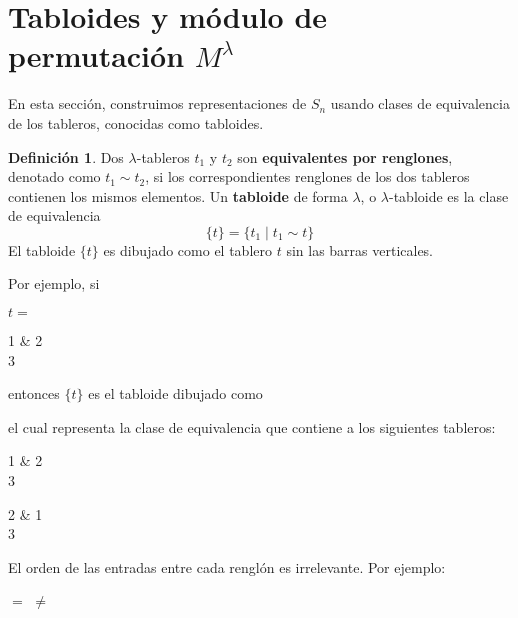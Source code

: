 \documentclass[12pt]{book}
\theoremstyle{definition}
\newtheorem{definition}[theorem]{Definición}
\newcounter{in}
\newcounter{ini}
\begin{document}
\section{Tabloides y módulo de permutación $M^{\lambda}$}
\label{modulo-permutacion}

En esta sección, construimos representaciones de $S_{n}$ usando clases
de equivalencia de los tableros, conocidas como tabloides.

\begin{definition}
  Dos $\lambda$-tableros $t_{1}$ y $t_{2}$ son \textbf{equivalentes
    por renglones}, denotado como $t_{1}\sim t_{2}$, si los
  correspondientes renglones de los dos tableros contienen los mismos
  elementos. Un \textbf{tabloide} de forma $\lambda$, o
  $\lambda$-tabloide es la clase de equivalencia
  $$\{t\}=\{t_{1}\mid t_{1}\sim t\}$$
  El tabloide $\{t\}$ es dibujado como el tablero $t$ sin las barras
  verticales.
\end{definition}
Por ejemplo, si
\begin{center}
  $t=$
  \begin{ytableau}
    1 & 2  \\
    3
  \end{ytableau}
\end{center}
entonces $\{t\}$ es el tabloide dibujado como

\begin{center}
\end{center}

el cual representa la clase de equivalencia que contiene a los
siguientes tableros:
\begin{center}  
  \begin{ytableau}
    1 & 2  \\
    3
  \end{ytableau}\qquad
  \begin{ytableau}
    2 & 1  \\
    3
  \end{ytableau}
\end{center}

El orden de las entradas entre cada renglón es irrelevante. Por
ejemplo:

\begin{center}
  \quad$=$\quad
  \quad$\neq$\quad
\end{center}
\end{document}

